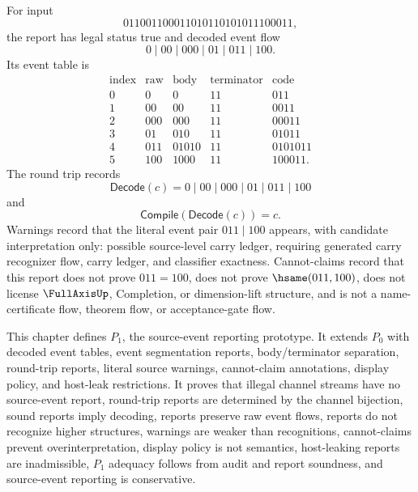 \begin{example}
\label{ex:source-report-full-completion}
For input
$$
  011001100011010110101011100011,
$$
the report has legal status true and decoded event flow
$$
  0\mid 00\mid 000\mid 01\mid 011\mid 100.
$$
Its event table is
$$
\begin{array}{c|c|c|c|c}
\text{index} & \text{raw} & \text{body} & \text{terminator} & \text{code}\\
\hline
0 & 0   & 0     & 11 & 011\\
1 & 00  & 00    & 11 & 0011\\
2 & 000 & 000   & 11 & 00011\\
3 & 01  & 010   & 11 & 01011\\
4 & 011 & 01010 & 11 & 0101011\\
5 & 100 & 1000  & 11 & 100011.
\end{array}
$$
The round trip records
$$
  \mathsf{Decode}(c)=0\mid 00\mid 000\mid 01\mid 011\mid 100
$$
and
$$
  \mathsf{Compile}(\mathsf{Decode}(c))=c.
$$
Warnings record that the literal event pair $011\mid 100$ appears, with candidate interpretation only: possible source-level carry ledger, requiring generated carry recognizer flow, carry ledger, and classifier exactness. Cannot-claims record that this report does not prove $011=100$, does not prove $\hsame(011,100)$, does not license $\FullAxisUp$, Completion, or dimension-lift structure, and is not a name-certificate flow, theorem flow, or acceptance-gate flow.
\end{example}

\begin{remark}[Summary]
\label{rem:source-report-summary}
This chapter defines $P_1$, the source-event reporting prototype. It extends $P_0$ with decoded event tables, event segmentation reports, body/terminator separation, round-trip reports, literal source warnings, cannot-claim annotations, display policy, and host-leak restrictions. It proves that illegal channel streams have no source-event report, round-trip reports are determined by the channel bijection, sound reports imply decoding, reports preserve raw event flows, reports do not recognize higher structures, warnings are weaker than recognitions, cannot-claims prevent overinterpretation, display policy is not semantics, host-leaking reports are inadmissible, $P_1$ adequacy follows from audit and report soundness, and source-event reporting is conservative.
\end{remark}
